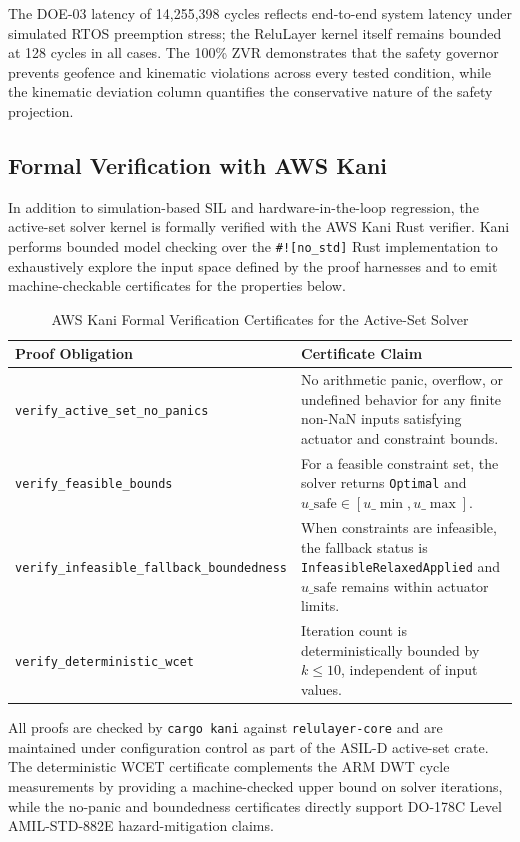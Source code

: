 \documentclass[11pt,oneside]{article}
\begin{document}
The DOE-03 latency of 14,255,398 cycles reflects end-to-end system latency under simulated RTOS preemption stress; the ReluLayer kernel itself remains bounded at 128 cycles in all cases. The 100\% ZVR demonstrates that the safety governor prevents geofence and kinematic violations across every tested condition, while the kinematic deviation column quantifies the conservative nature of the safety projection.

\subsection{Formal Verification with AWS Kani}

In addition to simulation-based SIL and hardware-in-the-loop regression, the active-set solver kernel is formally verified with the AWS Kani Rust verifier. Kani performs bounded model checking over the \texttt{\#![no\_std]} Rust implementation to exhaustively explore the input space defined by the proof harnesses and to emit machine-checkable certificates for the properties below.

\begin{table}[htbp]
\centering
\caption{AWS Kani Formal Verification Certificates for the Active-Set Solver}
\label{tab:kani_certificates}
\small
\begin{tabularx}{\textwidth}{@{}>{\raggedright\arraybackslash}X>{\raggedright\arraybackslash}p{5cm}@{}}
\toprule
\textbf{Proof Obligation} & \textbf{Certificate Claim} \\
\midrule
\texttt{verify\_active\_set\_no\_panics} & No arithmetic panic, overflow, or undefined behavior for any finite non-NaN inputs satisfying actuator and constraint bounds. \\
\texttt{verify\_feasible\_bounds} & For a feasible constraint set, the solver returns \texttt{Optimal} and \(u\_{\text{safe}} \in [u\_{\min}, u\_{\max}]\). \\
\texttt{verify\_infeasible\_fallback\_boundedness} & When constraints are infeasible, the fallback status is \texttt{InfeasibleRelaxedApplied} and \(u\_{\text{safe}}\) remains within actuator limits. \\
\texttt{verify\_deterministic\_wcet} & Iteration count is deterministically bounded by \(k \le 10\), independent of input values. \\
\bottomrule
\end{tabularx}
\end{table}

All proofs are checked by \texttt{cargo kani} against \texttt{relulayer-core} and are maintained under configuration control as part of the ASIL-D active-set crate. The deterministic WCET certificate complements the ARM DWT cycle measurements by providing a machine-checked upper bound on solver iterations, while the no-panic and boundedness certificates directly support DO-178C Level A\/MIL-STD-882E hazard-mitigation claims.
\end{document}
